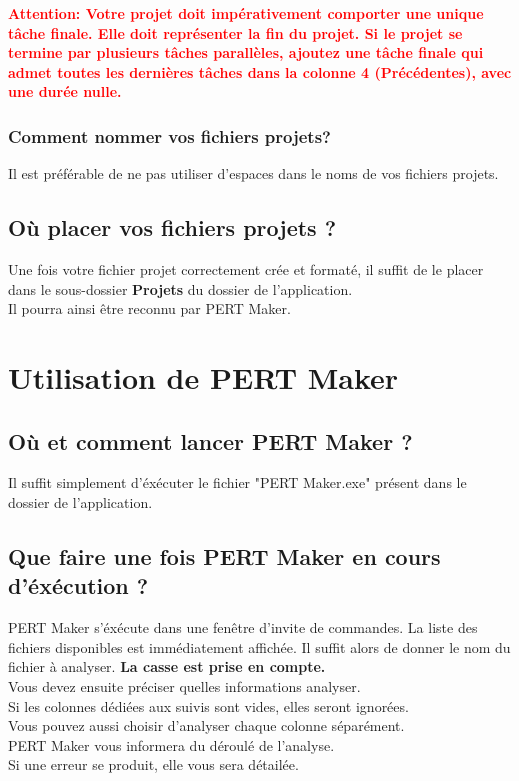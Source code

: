 \documentclass{article}
\begin{document}
\textbf{\textcolor{red}{Attention: Votre projet doit impérativement comporter une unique tâche finale. Elle doit représenter la fin du projet.
Si le projet se termine par plusieurs tâches parallèles, ajoutez une tâche finale qui admet toutes les dernières tâches dans la colonne
4 (Précédentes), avec une durée nulle.}}
\newpage
\subsubsection{Comment nommer vos fichiers projets?}
Il est préférable de ne pas utiliser d'espaces dans le noms de vos fichiers projets.\\

\subsection{Où placer vos fichiers projets ?}
Une fois votre fichier projet correctement crée et formaté, il suffit de le placer dans
le sous-dossier \textbf{Projets} du dossier de l'application. \\ Il pourra ainsi être reconnu
par PERT Maker. \\


\section{Utilisation de PERT Maker}
\subsection{Où et comment lancer PERT Maker ?}
Il suffit simplement d'éxécuter le fichier "PERT Maker.exe" présent dans le dossier de l'application.
\subsection{Que faire une fois PERT Maker en cours d'éxécution ?}
PERT Maker s'éxécute dans une fenêtre d'invite de commandes.
La liste des fichiers disponibles est immédiatement affichée.
Il suffit alors de donner le nom du fichier à analyser. \textbf{La casse est prise en compte.}\\
Vous devez ensuite préciser quelles informations analyser.\\
Si les colonnes dédiées aux suivis sont vides, elles seront ignorées.\\
Vous pouvez aussi choisir d'analyser chaque colonne séparément.\\
PERT Maker vous informera du déroulé de l'analyse.\\
Si une erreur se produit, elle vous sera détailée.
\end{document}
